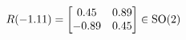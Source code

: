 \documentclass[preview]{standalone}
\begin{document}
\begin{align*}
\special{dvisvgm:raw <g id='unique000'>}R(-1.11) = \begin{bmatrix} 0.45 & 0.89 \\ -0.89 & 0.45 \end{bmatrix} \in \text{SO}(2)\special{dvisvgm:raw </g>}
\end{align*}
\end{document}
